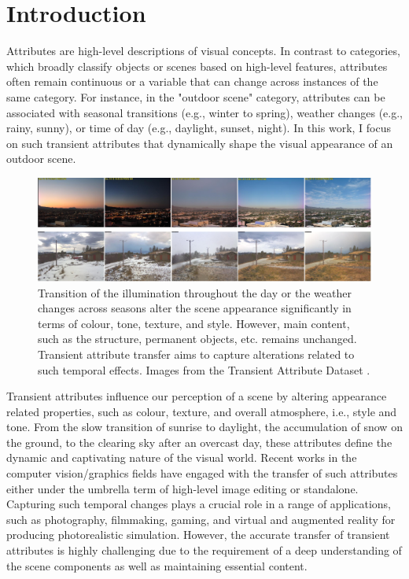 \section{Introduction}\label{sec:zero-shot-intro}


Attributes are high-level descriptions of visual concepts. In contrast to categories, which broadly classify objects or scenes based on high-level features, attributes often remain continuous or a variable that can change across instances of the same category. For instance, in the "outdoor scene" category, attributes can be associated with seasonal transitions (e.g., winter to spring), weather changes (e.g., rainy, sunny), or time of day (e.g., daylight, sunset, night).  In this work, I focus on such transient attributes that dynamically shape the visual appearance of an outdoor scene.

\begin{figure}[ht]
  \includegraphics[width=\textwidth]{Chapters/zero-shot-tat-figs/tat-teaser.pdf}
  \caption{Transition of the illumination throughout the day or the weather changes across seasons alter the scene appearance significantly in terms of colour, tone, texture, and style. However, main content, such as the structure, permanent objects, etc. remains unchanged. Transient attribute transfer aims to capture alterations related to such temporal effects. Images from the Transient Attribute Dataset \cite{laffont2014transient}.}
  \label{fig:zero-shot-teaser}
\end{figure}

Transient attributes influence our perception of a scene by altering appearance related properties, such as colour, texture, and overall atmosphere, i.e., style and tone. From the slow transition of sunrise to daylight, the accumulation of snow on the ground, to the clearing sky after an overcast day, these attributes define the dynamic and captivating nature of the visual world. Recent works in the computer vision/graphics fields have engaged with the transfer of such attributes either under the umbrella term of high-level image editing or standalone. Capturing such temporal changes plays a crucial role in a range of applications, such as photography, filmmaking, gaming, and virtual and augmented reality for producing photorealistic simulation. However, the accurate transfer of transient attributes is highly challenging due to the requirement of a deep understanding of the scene components as well as maintaining essential content. 


